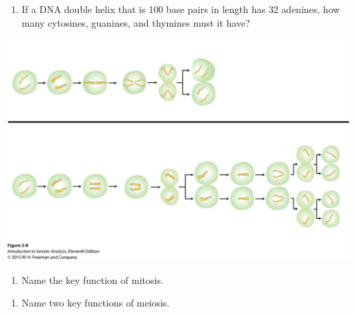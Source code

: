 \documentclass[11pt,]{article}
\providecommand{\tightlist}{%
  \setlength{\itemsep}{0pt}\setlength{\parskip}{0pt}}
\begin{document}
\begin{blackbox}

\begin{enumerate}
\def\labelenumi{\arabic{enumi}.}
\setcounter{enumi}{11}
\tightlist
\item
  If a DNA double helix that is 100 base pairs in length has 32
  adenines, how many cytosines, guanines, and thymines must it have?
\end{enumerate}

\vspace{19cm}

\end{blackbox}

\begin{landscape}

\begin{center}\includegraphics[width=1\linewidth,]{input/mitosis-meiosis} \end{center}

\end{landscape}

\begin{blackbox}

\begin{enumerate}
\def\labelenumi{\arabic{enumi}.}
\setcounter{enumi}{17}
\tightlist
\item
  Name the key function of mitosis.
\end{enumerate}

\vspace{19cm}

\end{blackbox}

\begin{blackbox}

\begin{enumerate}
\def\labelenumi{\arabic{enumi}.}
\setcounter{enumi}{18}
\tightlist
\item
  Name two key functions of meiosis.
\end{enumerate}

\vspace{19cm}

\end{blackbox}
\end{document}
